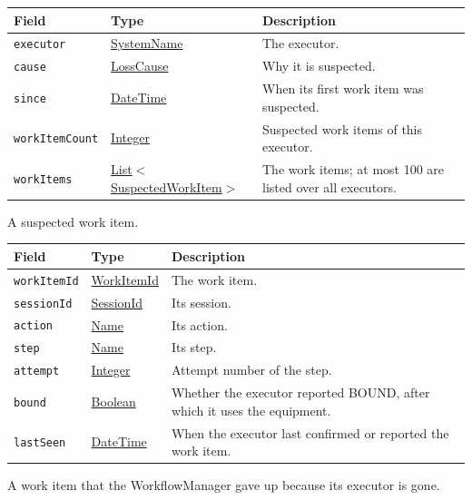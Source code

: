 \documentclass[a4paper]{arrowhead}
\newcommand{\mref}[1]{{\textcolor{ArrowheadPurple}{\hyperref[sec:model:#1]{#1}}}}
\newcommand{\pref}[1]{{\textcolor{ArrowheadGrey}{\hyperref[sec:model:primitives:#1]{#1}}}}
\begin{document}
{\small
\begin{longtable}{|p{3.9cm}|p{4.4cm}|p{7.5cm}|}

\hline
\rowcolor{gray!33} Field & Type & Description \\ \hline
\endhead
\texttt{executor} & \pref{SystemName} & The executor. \\ \hline
\texttt{cause} & \mref{LossCause} & Why it is suspected. \\ \hline
\texttt{since} & \pref{DateTime} & When its first work item was suspected. \\ \hline
\texttt{workItemCount} & \pref{Integer} & Suspected work items of this executor. \\ \hline
\texttt{workItems} & \pref{List}$<$\mref{SuspectedWorkItem}$>$ & The work items; at most 100 are listed over all executors. \\ \hline
\end{longtable}
}

A suspected work item.

{\small
\begin{longtable}{|p{3.9cm}|p{4.4cm}|p{7.5cm}|}

\hline
\rowcolor{gray!33} Field & Type & Description \\ \hline
\endhead
\texttt{workItemId} & \pref{WorkItemId} & The work item. \\ \hline
\texttt{sessionId} & \pref{SessionId} & Its session. \\ \hline
\texttt{action} & \pref{Name} & Its action. \\ \hline
\texttt{step} & \pref{Name} & Its step. \\ \hline
\texttt{attempt} & \pref{Integer} & Attempt number of the step. \\ \hline
\texttt{bound} & \pref{Boolean} & Whether the executor reported BOUND, after which it uses the equipment. \\ \hline
\texttt{lastSeen} & \pref{DateTime} & When the executor last confirmed or reported the work item. \\ \hline
\end{longtable}
}

A work item that the WorkflowManager gave up because its executor is gone.
\end{document}

